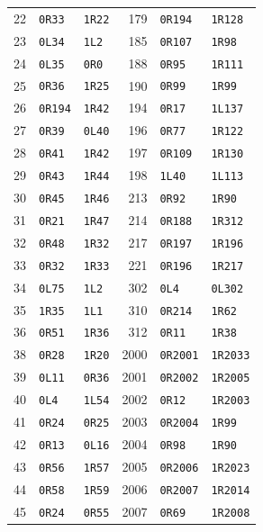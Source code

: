 \begin{longtable}{@{}rll@{\hspace{1.2cm}}rll@{}}
22 & \texttt{0R33} & \texttt{1R22} & 179 & \texttt{0R194} & \texttt{1R128}\\
23 & \texttt{0L34} & \texttt{1L2} & 185 & \texttt{0R107} & \texttt{1R98}\\
24 & \texttt{0L35} & \texttt{0R0} & 188 & \texttt{0R95} & \texttt{1R111}\\
25 & \texttt{0R36} & \texttt{1R25} & 190 & \texttt{0R99} & \texttt{1R99}\\
26 & \texttt{0R194} & \texttt{1R42} & 194 & \texttt{0R17} & \texttt{1L137}\\
27 & \texttt{0R39} & \texttt{0L40} & 196 & \texttt{0R77} & \texttt{1R122}\\
28 & \texttt{0R41} & \texttt{1R42} & 197 & \texttt{0R109} & \texttt{1R130}\\
29 & \texttt{0R43} & \texttt{1R44} & 198 & \texttt{1L40} & \texttt{1L113}\\
30 & \texttt{0R45} & \texttt{1R46} & 213 & \texttt{0R92} & \texttt{1R90}\\
31 & \texttt{0R21} & \texttt{1R47} & 214 & \texttt{0R188} & \texttt{1R312}\\
32 & \texttt{0R48} & \texttt{1R32} & 217 & \texttt{0R197} & \texttt{1R196}\\
33 & \texttt{0R32} & \texttt{1R33} & 221 & \texttt{0R196} & \texttt{1R217}\\
34 & \texttt{0L75} & \texttt{1L2} & 302 & \texttt{0L4} & \texttt{0L302}\\
35 & \texttt{1R35} & \texttt{1L1} & 310 & \texttt{0R214} & \texttt{1R62}\\
36 & \texttt{0R51} & \texttt{1R36} & 312 & \texttt{0R11} & \texttt{1R38}\\
38 & \texttt{0R28} & \texttt{1R20} & 2000 & \texttt{0R2001} & \texttt{1R2033}\\
39 & \texttt{0L11} & \texttt{0R36} & 2001 & \texttt{0R2002} & \texttt{1R2005}\\
40 & \texttt{0L4} & \texttt{1L54} & 2002 & \texttt{0R12} & \texttt{1R2003}\\
41 & \texttt{0R24} & \texttt{0R25} & 2003 & \texttt{0R2004} & \texttt{1R99}\\
42 & \texttt{0R13} & \texttt{0L16} & 2004 & \texttt{0R98} & \texttt{1R90}\\
43 & \texttt{0R56} & \texttt{1R57} & 2005 & \texttt{0R2006} & \texttt{1R2023}\\
44 & \texttt{0R58} & \texttt{1R59} & 2006 & \texttt{0R2007} & \texttt{1R2014}\\
45 & \texttt{0R24} & \texttt{0R55} & 2007 & \texttt{0R69} & \texttt{1R2008}\\

\end{longtable}
